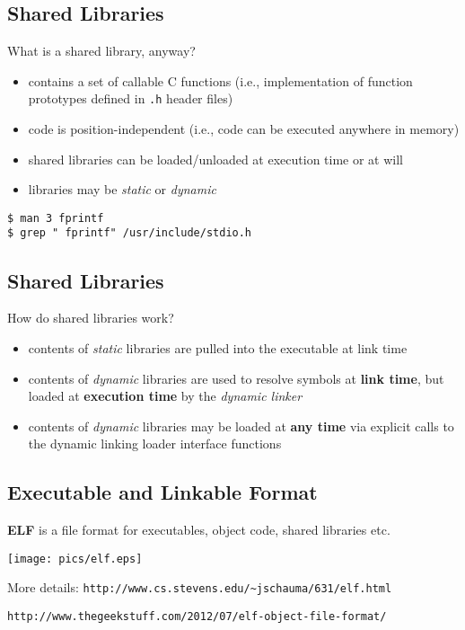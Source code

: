 \documentclass[xga]{xdvislides}
\begin{document}
\subsection{Shared Libraries}
What is a shared library, anyway?
\begin{itemize}
	\item contains a set of callable C functions (i.e., implementation
		of function prototypes defined in {\tt .h} header files)
	\item code is position-independent (i.e., code can be executed anywhere
		in memory)
	\item shared libraries can be loaded/unloaded at execution time or at will
	\item libraries may be {\em static} or {\em dynamic}
\end{itemize}
\begin{verbatim}
$ man 3 fprintf
$ grep " fprintf" /usr/include/stdio.h
\end{verbatim}


\subsection{Shared Libraries}
How do shared libraries work?
\begin{itemize}
	\item contents of {\em static} libraries are pulled into the
		executable at link time
	\item contents of {\em dynamic} libraries are used to resolve
		symbols at {\bf link time}, but loaded at {\bf execution time} by the
		{\em dynamic linker}
	\item contents of {\em dynamic} libraries may be loaded at {\bf any
		time} via explicit calls to the dynamic linking loader interface
		functions
\end{itemize}

\subsection{Executable and Linkable Format}

{\bf ELF} is a file format for executables, object code, shared libraries
etc.

\begin{center}
	\texttt{[image: pics/elf.eps]}
\end{center}
More details:
\verb+http://www.cs.stevens.edu/~jschauma/631/elf.html+

\verb+http://www.thegeekstuff.com/2012/07/elf-object-file-format/+
\Normalsize
\end{document}
